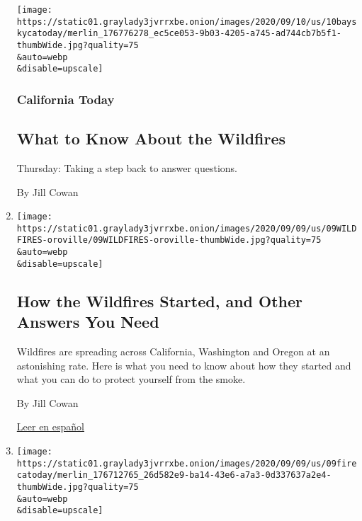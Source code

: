 \begin{enumerate}
  \texttt{[image: https://static01.graylady3jvrrxbe.onion/images/2020/09/10/us/10bayskycatoday/merlin\_176776278\_ec5ce053-9b03-4205-a745-ad744cb7b5f1-thumbWide.jpg?quality=75\\\&auto=webp\\\&disable=upscale]}

  \hypertarget{california-today-1}{%
  \subsubsection{California Today}\label{california-today-1}}

  \hypertarget{what-to-know-about-the-wildfires}{%
  \subsection{What to Know About the
  Wildfires}\label{what-to-know-about-the-wildfires}}

  Thursday: Taking a step back to answer questions.

  By Jill Cowan
\item
  \href{/article/wildfires-california-oregon-washington.html}{}

  \texttt{[image: https://static01.graylady3jvrrxbe.onion/images/2020/09/09/us/09WILDFIRES-oroville/09WILDFIRES-oroville-thumbWide.jpg?quality=75\\\&auto=webp\\\&disable=upscale]}

  \hypertarget{how-the-wildfires-started-and-other-answers-you-need}{%
  \subsection{How the Wildfires Started, and Other Answers You
  Need}\label{how-the-wildfires-started-and-other-answers-you-need}}

  Wildfires are spreading across California, Washington and Oregon at an
  astonishing rate. Here is what you need to know about how they started
  and what you can do to protect yourself from the smoke.

  By Jill Cowan

  \href{https://www.nytimes3xbfgragh.onion/es/2020/09/10/espanol/estados-unidos/incendios-california-oregon-washington.html}{Leer
  en español}
\item
  \href{/2020/09/09/us/california-wildfires.html}{}

  \texttt{[image: https://static01.graylady3jvrrxbe.onion/images/2020/09/09/us/09firecatoday/merlin\_176712765\_26d582e9-ba14-43e6-a7a3-0d337637a2e4-thumbWide.jpg?quality=75\\\&auto=webp\\\&disable=upscale]}

  \hypertarget{california-today-2}{%
}
\end{enumerate}
